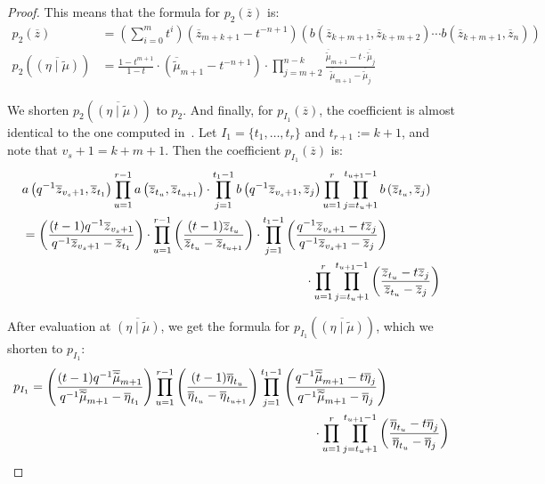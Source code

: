 \documentclass[ALCO]{cedram}
\newcommand{\mutilde}{{\widetilde{\mu}}}
\newcommand{\etamutilde}{{(\eta \mid \widetilde{\mu})}}
\newcommand{\pIone}{p_{I_1}(\overline{z})}
\newcommand{\pIoneevaluated}{p_{I_1}\left(\overline{\etamutilde}\right)}
\newcommand{\pItwo}{p_{2}(\overline{z})}
\newcommand{\pItwoevaluated}{p_{2}\left(\overline{\etamutilde}\right)}
\begin{document}
\begin{proof}
This means that the formula for $\pItwo$ is:
\begin{align*} \pItwo &= \left( \sum_{i=0}^{m} t^i \right) (\overline{z}_{m+k+1}-t^{-n+1}) (b(\overline{z}_{k+m+1},\overline{z}_{k+m+2}) \dotsm b(\overline{z}_{k+m+1}, \overline{z}_{n}))\\
\pItwoevaluated&=\frac{1-t^{m+1}}{1-t}\cdot (\overline{\mutilde}_{m+1} - t^{-n+1}) \cdot \prod_{j=m+2}^{n-k} \frac{\overline{\mutilde}_{m+1} - t \cdot \overline{\mutilde}_j}{\overline{\mutilde}_{m+1} - \overline{\mutilde}_j}\end{align*}

We shorten $\pItwoevaluated$ to $p_{2}$. And finally, for $\pIone$, the coefficient is almost identical to the one computed in~\cite{MR2525842}. Let $I_1 = \{ t_1, \dotsc, t_r \}$ and $t_{r+1}:= k+1$, and note that $v_s+1 = k+m+1$. Then the coefficient $\pIone$ is:
\begin{align*}
     & a\left(q^{-1} \overline{z}_{v_s+1}, \overline{z}_{t_1} \right) \prod_{u=1}^{r-1} a \left(\overline{z}_{t_u},\overline{z}_{t_{u+1}} \right) \cdot \prod_{j=1}^{t_1-1} b \left(q^{-1}\overline{z}_{v_s+1}, \overline{z}_j \right) \prod_{u=1}^{r} \prod_{j=t_u+1}^{t_{u+1}-1} b \left( \overline{z}_{t_u},\overline{z}_j\right)\\
    &=\left(\frac{(t-1)q^{-1} \overline{z}_{v_s+1}}{q^{-1} \overline{z}_{v_s+1}-\overline{z}_{t_1}}\right) \cdot \prod_{u=1}^{r-1} \left(\frac{(t-1) \overline{z}_{t_u}}{ \overline{z}_{t_u}-\overline{z}_{t_{u+1}}} \right) \cdot \prod_{j=1}^{t_1-1} \left( \frac{q^{-1} \overline{z}_{v_s+1} - t \overline{z}_j}{q^{-1} \overline{z}_{v_s+1} -  \overline{z}_j}\right) \\ & \hspace*{8cm} \cdot  \prod_{u=1}^{r} \prod_{j=t_u+1}^{t_{u+1}-1} \left( \frac{\overline{z}_{t_u} - t \overline{z}_j}{ \overline{z}_{t_u} -  \overline{z}_j} \right)
\end{align*}

After evaluation at $\overline{\etamutilde}$, we get the formula for $\pIoneevaluated$, which we shorten to $p_{I_1}$:
\begin{align*} p_{I_1} &=  \left( \frac{(t-1)q^{-1} \overline{\mutilde}_{m+1}}{q^{-1} \overline{\mutilde}_{m+1}-\overline{\eta}_{t_1}} \right) \prod_{u=1}^{r-1} \left(\frac{(t-1) \overline{\eta}_{t_u}}{ \overline{\eta}_{t_u}-\overline{\eta}_{t_{u+1}}}\right)  \prod_{j=1}^{t_1-1} \left( \frac{q^{-1} \overline{\mutilde}_{m+1} - t \overline{\eta}_j}{q^{-1} \overline{\mutilde}_{m+1} -  \overline{\eta}_j} \right) \\ &\hspace*{8cm} \cdot \prod_{u=1}^{r} \prod_{j=t_u+1}^{t_{u+1}-1}  \left(\frac{\overline{\eta}_{t_u} - t \overline{\eta}_j}{ \overline{\eta}_{t_u} -  \overline{\eta}_j} \right)\end{align*}



\end{proof}
\end{document}
